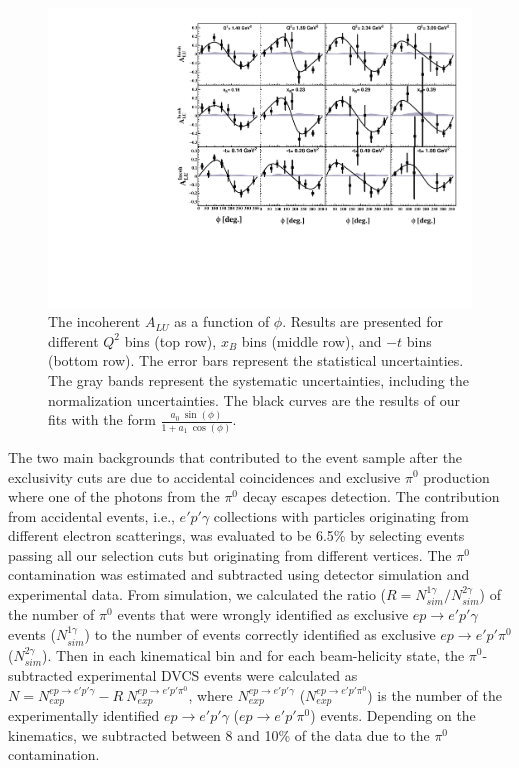 \documentclass[twocolumn,nofootinbib,prl,superscriptaddress,secnumarabic,amssymb,nobibnotes,aps,floatfix]{revtex4}
\begin{document}
\begin{figure}[t!]
\includegraphics[width=13.9cm]{figs/incoherent_ALU_phi.pdf}
\caption{The incoherent $A_{LU}$ as a function of $\phi$. Results are presented
   for different $Q^{2}$ bins (top row), $x_{B}$ bins (middle row), and $-t$ 
   bins (bottom row). The error bars represent the statistical uncertainties.  
   The gray bands represent the systematic uncertainties, including the 
   normalization uncertainties. The black curves are the results of our fits 
   with the form $\frac{a_{0}~\sin(\phi)}{1+ a_{1}~\cos(\phi)}$.}
\label{fig:alu}
\end{figure}


The two main backgrounds that contributed to the event sample after the 
exclusivity cuts are due to accidental coincidences and exclusive $\pi^0$ 
production where one of the photons from the $\pi^0$ decay escapes detection.  
The contribution from accidental events, i.e., $e'p'\gamma$ collections with 
particles originating from different electron scatterings, was evaluated to be 
6.5\% by selecting events passing all our selection cuts but originating from 
different vertices. The $\pi^0$ contamination was estimated and subtracted using detector 
simulation and experimental data. From simulation, we calculated the ratio ($R 
= N^{1\gamma}_{sim}/N^{2\gamma}_{sim}$) of the number of $\pi^0$ events that 
were wrongly identified as exclusive $ep\rightarrow e'p'\gamma$ events ($N^{1\gamma}_{sim}$) to the 
number of events correctly identified as exclusive $ep\rightarrow e'p'\pi^0$ ($N^{2\gamma}_{sim}$).  
Then in each kinematical bin and for each beam-helicity state, the 
$\pi^0$-subtracted experimental DVCS events were calculated as $N = 
N^{ep\rightarrow e'p'\gamma}_{exp}- R~N^{ep\rightarrow e'p'\pi^0}_{exp}$, where 
$N^{ep\rightarrow e'p'\gamma}_{exp}$ ($N^{ep\rightarrow e'p'\pi^0}_{exp}$) is 
the number of the experimentally identified $ep\rightarrow e'p'\gamma$ 
($ep\rightarrow e'p'\pi^0$) events. Depending on the kinematics, we subtracted
between 8 and 10\% of the data due to the $\pi^0$ contamination. 
\end{document}
